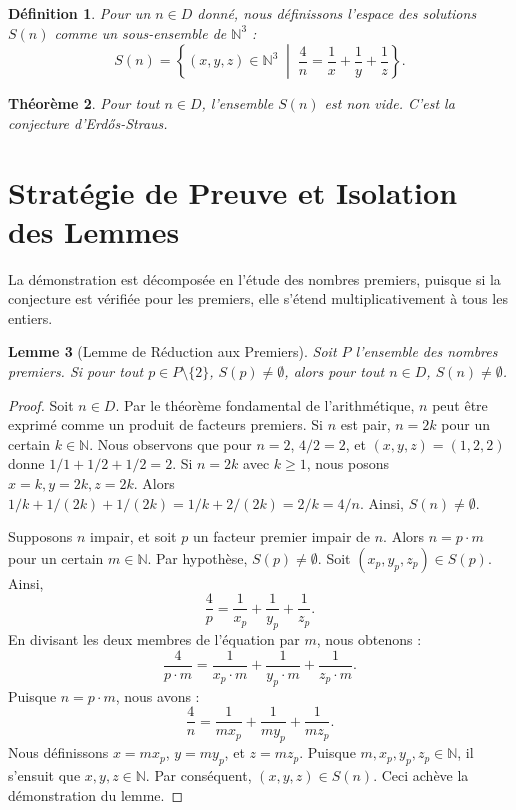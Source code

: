 \documentclass[12pt,a4paper]{article}
\newtheorem{theorem}{Théorème}[section]
\newtheorem{lemma}[theorem]{Lemme}
\newtheorem{definition}[theorem]{Définition}
\begin{document}
\begin{definition}
Pour un $n \in D$ donné, nous définissons l'espace des solutions $S(n)$ comme un sous-ensemble de $\mathbb{N}^3$ :
\[
S(n) = \left\{ (x, y, z) \in \mathbb{N}^3 \;\middle|\; \frac{4}{n} = \frac{1}{x} + \frac{1}{y} + \frac{1}{z} \right\}.
\]
\end{definition}

\begin{theorem}
Pour tout $n \in D$, l'ensemble $S(n)$ est non vide. C'est la conjecture d'Erd\H{o}s-Straus.
\end{theorem}

\section{Stratégie de Preuve et Isolation des Lemmes}

La démonstration est décomposée en l'étude des nombres premiers, puisque si la conjecture est vérifiée pour les premiers, elle s'étend multiplicativement à tous les entiers.

\begin{lemma}[Lemme de Réduction aux Premiers]
Soit $P$ l'ensemble des nombres premiers. Si pour tout $p \in P \setminus \{2\}$, $S(p) \neq \emptyset$, alors pour tout $n \in D$, $S(n) \neq \emptyset$.
\end{lemma}

\begin{proof}
Soit $n \in D$. Par le théorème fondamental de l'arithmétique, $n$ peut être exprimé comme un produit de facteurs premiers.
Si $n$ est pair, $n = 2k$ pour un certain $k \in \mathbb{N}$. Nous observons que pour $n = 2$, $4/2 = 2$, et $(x,y,z) = (1, 2, 2)$ donne $1/1 + 1/2 + 1/2 = 2$. Si $n = 2k$ avec $k \ge 1$, nous posons $x = k, y = 2k, z = 2k$. Alors $1/k + 1/(2k) + 1/(2k) = 1/k + 2/(2k) = 2/k = 4/n$. Ainsi, $S(n) \neq \emptyset$.

Supposons $n$ impair, et soit $p$ un facteur premier impair de $n$. Alors $n = p \cdot m$ pour un certain $m \in \mathbb{N}$.
Par hypothèse, $S(p) \neq \emptyset$. Soit $(x_p, y_p, z_p) \in S(p)$. Ainsi,
\[
\frac{4}{p} = \frac{1}{x_p} + \frac{1}{y_p} + \frac{1}{z_p}.
\]
En divisant les deux membres de l'équation par $m$, nous obtenons :
\[
\frac{4}{p \cdot m} = \frac{1}{x_p \cdot m} + \frac{1}{y_p \cdot m} + \frac{1}{z_p \cdot m}.
\]
Puisque $n = p \cdot m$, nous avons :
\[
\frac{4}{n} = \frac{1}{m x_p} + \frac{1}{m y_p} + \frac{1}{m z_p}.
\]
Nous définissons $x = m x_p$, $y = m y_p$, et $z = m z_p$. Puisque $m, x_p, y_p, z_p \in \mathbb{N}$, il s'ensuit que $x, y, z \in \mathbb{N}$.
Par conséquent, $(x, y, z) \in S(n)$. Ceci achève la démonstration du lemme.
\end{proof}
\end{document}
